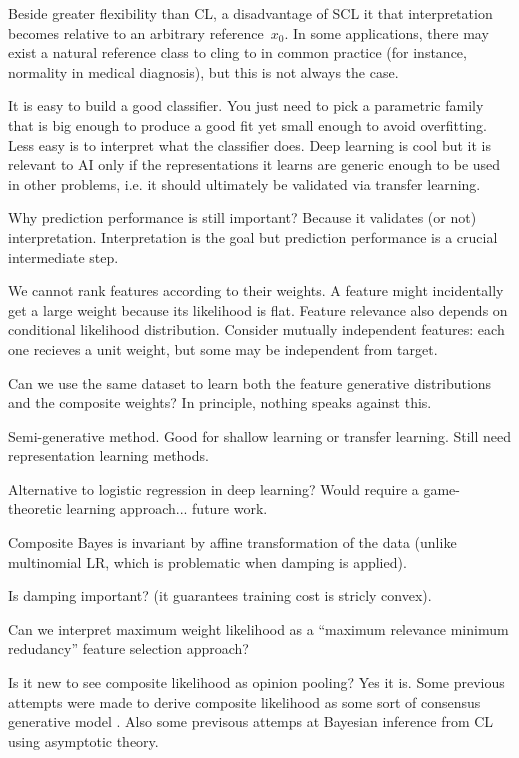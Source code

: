 \documentclass[english]{scrartcl}
\begin{document}
Beside greater flexibility than CL, a disadvantage of SCL it that interpretation becomes relative to an arbitrary reference~$x_0$. In some applications, there may exist a natural reference class to cling to in common practice (for instance, normality in medical diagnosis), but this is not always the case. 


It is easy to build a good classifier. You just need to pick a parametric family that is big enough to produce a good fit yet small enough to avoid overfitting. Less easy is to interpret what the classifier does. Deep learning is cool but it is relevant to AI only if the representations it learns are generic enough to be used in other problems, i.e. it should ultimately be validated via transfer learning.

{\color{red} Why prediction performance is still important? Because it validates (or not) interpretation. Interpretation is the goal but prediction performance is a crucial intermediate step.}

{\color{red} We cannot rank features according to their weights. A feature might incidentally get a large weight because its likelihood is flat. Feature relevance also depends on conditional likelihood distribution. Consider mutually independent features: each one recieves a unit weight, but some may be independent from target.}

{\color{red} Can we use the same dataset to learn both the feature generative distributions and the composite weights? In principle, nothing speaks against this.} 

{\color{red} Semi-generative method. Good for shallow learning or transfer learning. Still need representation learning methods.}

{\color{red} Alternative to logistic regression in deep learning? Would require a game-theoretic learning approach... future work.} 

{\color{red} Composite Bayes is invariant by affine transformation of the data (unlike multinomial LR, which is problematic when damping is applied).}

{\color{red} Is damping important? (it guarantees training cost is stricly convex).}

{\color{red} Can we interpret maximum weight likelihood as a ``maximum relevance minimum redudancy'' feature selection approach?}

Is it new to see composite likelihood as opinion pooling? Yes it is. Some previous attempts were made to derive composite likelihood as some sort of consensus generative model \cite{Wang-14}. Also some previsous attemps at Bayesian inference from CL using asymptotic theory. 
\end{document}
